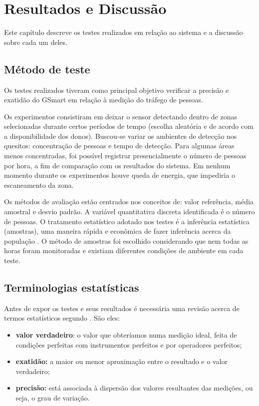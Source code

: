 \chapter{Resultados e Discussão}
\label{resultados-discussao}

Este capítulo descreve os testes realizados em relação ao sistema e a discussão sobre cada um deles.

\section{Método de teste}
\label{metodo-teste}
Os testes realizados tiveram como principal objetivo verificar a precisão e exatidão do GSmart em relação à medição do tráfego de pessoas.

Os experimentos consistiram em deixar o sensor detectando dentro de zonas
selecionadas durante certos períodos de tempo (escolha aleatória e de acordo com a disponibilidade
dos donos). Buscou-se variar os ambientes de detecção nos quesitos: concentração de pessoas e tempo de detecção. Para algumas áreas menos concentradas, foi possível registrar presencialmente o número de
pessoas por hora, a fim de comparação com os resultados do sistema. Em nenhum momento durante os experimentos houve queda de energia, que impediria o escaneamento da zona.

Os métodos de avaliação estão centrados nos conceitos de: valor referência, média amostral e desvio padrão.
A variável quantitativa discreta identificada é o número de pessoas. O tratamento estatístico adotado nos testes
é a inferência estatística (amostras), uma maneira rápida e econômica de fazer
inferência acerca da população \cite{Cabral2004}. O método de amostras
foi escolhido considerando que nem todas as horas foram monitoradas e existiam diferentes condições
de ambiente em cada teste.

\section{Terminologias estatísticas}
Antes de expor os testes e seus resultados é necessária uma revisão acerca de termos estatísticos segundo . São eles:
\begin{itemize}
    \item \textbf{valor verdadeiro}: o valor que obteríamos numa medição ideal, feita de condições
    perfeitas com instrumentos perfeitos e por operadores perfeitos;
    \item \textbf{exatidão:} a maior ou menor aproximação entre o resultado e o valor verdadeiro;
    \item \textbf{precisão:} está associada à dispersão dos valores resultantes das medições, ou seja, o grau de variação.
\end{itemize}

